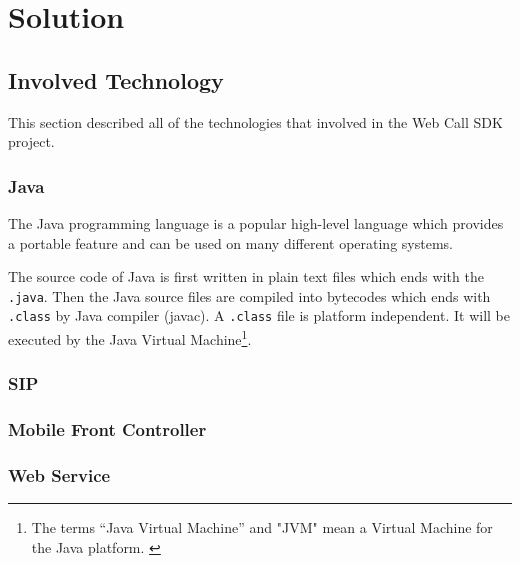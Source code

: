 \chapter{Solution}
\label{sec:Solution}

\section{Involved Technology}
\label{sec:Solution:InvolvedTechnology}

This section described all of the technologies that involved in the Web Call SDK project.

\subsection{Java}
\label{sec:Solution:InvolvedTechnology:Java}

The Java\texttrademark{} programming language is a popular high-level language which provides a portable feature and can be used on many different operating systems. 

The source code of Java is first written in plain text files which ends with the \nolinebreak\texttt{.java}. Then the Java source files are compiled into bytecodes which ends with \nolinebreak\texttt{.class} by Java compiler (javac). A \nolinebreak\texttt{.class} file is platform independent. It will be executed by the Java Virtual Machine\label{sym:JVM}\footnote{The terms ``Java Virtual Machine'' and "JVM" mean a Virtual Machine for the Java platform. \cite{TheJavaProgrammingLanguage}}.\cite{TheJavaProgrammingLanguage}

\subsection{SIP}
\label{sec:Solution:InvolvedTechnology:SIP}


\subsection{Mobile Front Controller}
\label{sec:Solution:InovlvedTechnology:MobileFrontController}


\subsection{Web Service}
\label{sec:Solution:InovlvedTechnology:WebService}












